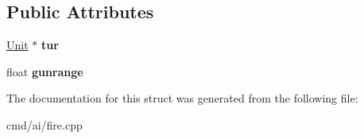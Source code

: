 \subsection*{Public Attributes}
\begin{DoxyCompactItemize}
\item 
\hyperlink{classUnit}{Unit} $\ast$ {\bfseries tur}\hypertarget{structRangeSortedTurrets_a0d1b51b17c546396afd26c12e3b4ea1c}{}\label{structRangeSortedTurrets_a0d1b51b17c546396afd26c12e3b4ea1c}

\item 
float {\bfseries gunrange}\hypertarget{structRangeSortedTurrets_a9dc6c75e7fb1fa5868309d421a9204c1}{}\label{structRangeSortedTurrets_a9dc6c75e7fb1fa5868309d421a9204c1}

\end{DoxyCompactItemize}


The documentation for this struct was generated from the following file\+:\begin{DoxyCompactItemize}
\item 
cmd/ai/fire.\+cpp\end{DoxyCompactItemize}
